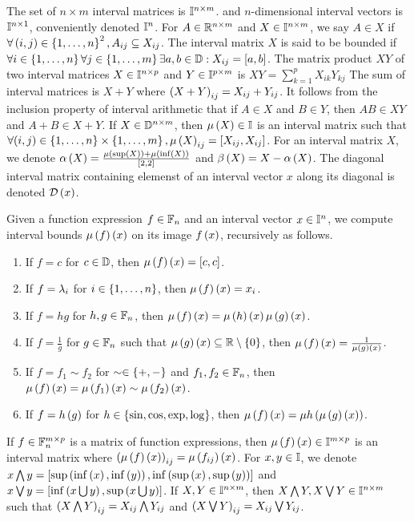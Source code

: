 The set of $n\times m$ interval matrices is $\mathbb{I}^{n\times m}$.
and $n$-dimensional interval vectors is $\mathbb{I}^{n\times 1}$,
conveniently denoted $\mathbb{I}^{n}$.  For $A\in\mathbb{R}^{n\times m}$
and $X\in\mathbb{I}^{n\times m}$, we say $A\in X$ if
$\forall \left(i,j\right)\in\left\{1,\ldots,n\right\}^2, A_{ij}\subseteq X_{ij}$.  The
interval matrix $X$ is said to be bounded if $\forall
i\in\left\{1,\ldots,n\right\}\forall j\in\left\{1,\ldots,m\right\} \exists
a,b\in\mathbb{D}: X_{ij} = [a,b]$.  The matrix product $XY$ of two
interval matrices $X\in\mathbb{I}^{n\times p}$ and
$Y\in\mathbb{I}^{p\times m}$ is $XY = \sum_{k=1}^pX_{ik}Y_{kj}$ The
sum of interval matrices is $X + Y$ where $\left(X+Y\right)_{ij} = X_{ij} +
Y_{ij}$.  It follows from the inclusion property of interval
arithmetic that if $A\in X$ and $B\in Y$, then $AB\in XY$ and $A+B\in
X+Y$.  If $X\in\mathbb{D}^{n\times m}$, then $\mu\left(X\right)\in\mathbb{I}$ is
an interval matrix such that $\forall
(i,j)\in\left\{1,\ldots,n\right\}\times\left\{1,\ldots,m\right\},\mu\left(X\right)_{ij} =
[X_{ij},X_{ij}]$.  For an interval matrix $X$, we denote $\alpha\left(X\right)
= \frac{\mu\left(\sup\left(X\right)\right) + \mu\left(\inf\left(X\right)\right)}{[2,2]}$ and $\beta\left(X\right)
= X - \alpha\left(X\right)$.  The diagonal interval matrix containing elemenst of an
interval vector $x$ along its diagonal is denoted $\mathcal{D}\left(x\right)$.

Given a function expression $f\in\mathbb{F}_{n}$ and an
interval vector $x\in\mathbb{I}^n$, we compute interval bounds
$\mu\left(f\right)\left(x\right)$ on its image $f\left(x\right)$, recursively as follows.
%
\begin{enumerate}
\item If $f = c$ for $c\in\mathbb{D}$, then $\mu\left(f\right)\left(x\right) = [c,c]$.
\item If $f = \lambda_{i}$ for $i\in\left\{1,\ldots,n\right\}$, then $\mu\left(f\right)\left(x\right) =
x_i$.
\item If $f = hg$ for $h,g\in\mathbb{F}_{n}$, then $\mu\left(f\right)\left(x\right)
= \mu\left(h\right)\left(x\right)\mu\left(g\right)\left(x\right)$.
\item If $f = \frac{1}{g}$ for $g\in\mathbb{F}_{n}$ such that
$\mu\left(g\right)\left(x\right)\subseteq\mathbb{R}\setminus \left\{0\right\}$, then $\mu\left(f\right)\left(x\right)
= \frac{1}{\mu\left(g\right)\left(x\right)}$.
\item If $f = f_1\sim f_2$ for $\sim\in\left\{+,-\right\}$ and
$f_1,f_2\in\mathbb{F}_{n}$, then $\mu\left(f\right)\left(x\right) = \mu\left(f_1\right)\left(x\right)\sim\mu\left(f_2\right)\left(x\right)$.
\item If $f = h\left(g\right)$ for $h\in\left\{\sin, \cos, \exp, \log\right\}$, then
$\mu\left(f\right)\left(x\right) = \mu{h}\left(\mu\left(g\right)\left(x\right)\right)$.
\end{enumerate}
%
If $f\in\mathbb{F}_{n}^{m\times p}$ is a matrix of function expressions, then
$\mu\left(f\right)\left(x\right)\in \mathbb{I}^{m\times p}$ is an interval matrix where
$\left(\mu\left(f\right)\left(x\right)\right)_{ij} = \mu\left(f_{ij}\right)\left(x\right)$.  For $x,y\in\mathbb{I}$, we
denote $x\bigwedge y =
[\sup\left(\inf\left(x\right),\inf\left(y\right)\right),\inf\left(\sup\left(x\right),\sup\left(y\right)\right)]$ and
$x\bigvee y = [\inf\left(x\bigcup y\right), \sup\left(x\bigcup y\right)]$.  If
$X,Y\in\mathbb{I}^{n\times m}$, then
$X\bigwedge Y,X\bigvee Y\in\mathbb{I}^{n\times m}$ such that
$\left(X\bigwedge Y\right)_{ij} = X_{ij}\bigwedge Y_{ij}$ and
$\left(X\bigvee Y\right)_{ij} = X_{ij}\bigvee Y_{ij}$.
%

